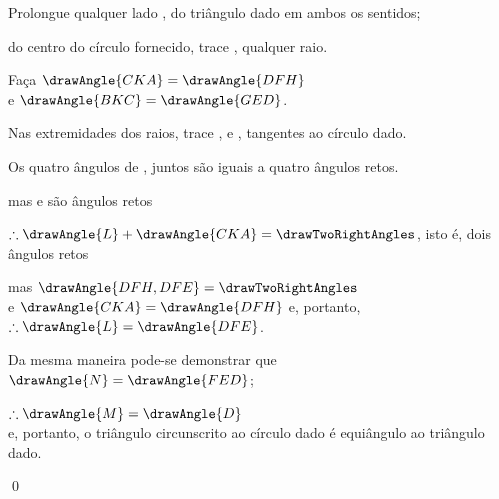 \documentclass[booklanguage=brazilian]{byrnebook}
\begin{document}
\begin{center}
Prolongue qualquer lado , do triângulo dado em ambos os sentidos;

do centro do círculo fornecido, trace , qualquer raio.

Faça $\drawAngle{CKA} = \drawAngle{DFH}$ \\
e $\drawAngle{BKC} = \drawAngle{GED}$.

Nas extremidades dos raios, trace ,  e , tangentes ao círculo dado. 

Os quatro ângulos de
,
juntos são iguais a quatro ângulos retos. 

mas  e  são ângulos retos \byref{\constref}

$\therefore \drawAngle{L} + \drawAngle{CKA} = \drawTwoRightAngles$, isto é, dois ângulos retos

mas $\drawAngle{DFH,DFE} = \drawTwoRightAngles$ \\
e $\drawAngle{CKA} = \drawAngle{DFH}$ \byref{\constref} e, portanto, $\therefore \drawAngle{L} = \drawAngle{DFE}$.

Da mesma maneira pode-se demonstrar que\\
$\drawAngle{N} = \drawAngle{FED}$;

$\therefore \drawAngle{M} = \drawAngle{D}$ \\
e, portanto, o triângulo circunscrito ao círculo dado é equiângulo ao triângulo dado.
\end{center}

\qed
\end{document}
